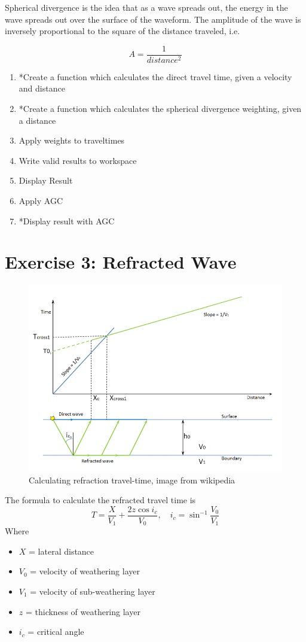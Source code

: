 \documentclass[a4paper, 10pt]{article}
\begin{document}
Spherical divergence is the idea that as a wave spreads out, the energy in the wave spreads out over the surface of the waveform. The amplitude of the wave is inversely proportional to the square of the distance traveled, i.e.

\[ A = \frac{1}{distance^2}\]

\begin{enumerate}
\item *Create a function which calculates the direct travel time, given a velocity and distance
\item *Create a function which calculates the spherical divergence weighting, given a distance
\item Apply weights to traveltimes
\item Write valid results to workspace
\item Display Result
\item Apply AGC
\item *Display result with AGC
\end{enumerate}

\newpage
\section*{Exercise 3: Refracted Wave}
\begin{figure}[h]
\centering
\includegraphics[scale=0.5]{800px-Refraction_2layers.png}
\caption{Calculating refraction travel-time, image from wikipedia}
\end{figure}
The formula to calculate the refracted travel time is 
\[T = \frac{X}{V_1} + \frac{2z \cos{i_c}}{V_0}, \quad i_c = \sin^{-1}{\frac{V_0}{V_1}} \]
Where
\begin{itemize}
\item $X$ = lateral distance
\item $V_0$ = velocity of weathering layer
\item $V_1$ = velocity of sub-weathering layer
\item $z$ = thickness of weathering layer
\item $i_c$ = critical angle
\end{itemize}
\end{document}
